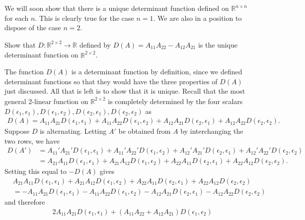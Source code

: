 \documentclass[12pt,letterpaper,reqno]{article}
\numberwithin{equation}{section}
\begin{document}
We will soon show that there is a unique determinant function defined on $\mathbb{R}^{\overline{n} \times \overline{n}}$ for each $n$. This is clearly true for the case $n=1$. We are also in a position to dispose of the case $n=2$.

\begin{exercise}
Show that $D:\mathbb{R}^{\overline{2} \times \overline{2}} \to \mathbb{R}$ defined by $D(A)=A_{11}A_{22}-A_{12}A_{21}$ is the unique determinant function on $\mathbb{R}^{\overline{2} \times \overline{2}}$.
\end{exercise}

{\color{red} 
The function $D(A)$ is a determinant function by definition, since we defined determinant functions so that they would have the three properties of $D(A)$ just discussed. All that is left is to show that it is unique. Recall that the most general 2-linear function on $\mathbb{R}^{\overline{2} \times \overline{2}}$ is completely determined by the four scalars $D(\epsilon_1,\epsilon_1), D(\epsilon_1,\epsilon_2), D(\epsilon_2,\epsilon_1), D(\epsilon_2,\epsilon_2)$ as
\begin{align*}
	D(A)=A_{11}A_{21}D(\epsilon_1,\epsilon_1)+A_{11}A_{22}D(\epsilon_1,\epsilon_2)+A_{12}A_{21}D(\epsilon_2,\epsilon_1)+A_{12}A_{22}D(\epsilon_2,\epsilon_2).
\end{align*}
Suppose $D$ is alternating. Letting $A'$ be obtained from $A$ by interchanging the two rows, we have
\begin{align*}
D(A')&=A_{11}'A_{21}'D(\epsilon_1,\epsilon_1)+A_{11}'A_{22}'D(\epsilon_1,\epsilon_2)+A_{12}'A_{21}'D(\epsilon_2,\epsilon_1)+A_{12}'A_{22}'D(\epsilon_2,\epsilon_2) \\
	&=A_{21}A_{11}D(\epsilon_1,\epsilon_1)+A_{21}A_{12}D(\epsilon_1,\epsilon_2)+A_{22}A_{11}D(\epsilon_2,\epsilon_1)+A_{22}A_{12}D(\epsilon_2,\epsilon_2).
\end{align*}
Setting this equal to $-D(A)$ gives
\begin{align*}
	&A_{21}A_{11}D(\epsilon_1,\epsilon_1)+A_{21}A_{12}D(\epsilon_1,\epsilon_2)+A_{22}A_{11}D(\epsilon_2,\epsilon_1)+A_{22}A_{12}D(\epsilon_2,\epsilon_2)\\
	&=-A_{11}A_{21}D(\epsilon_1,\epsilon_1)-A_{11}A_{22}D(\epsilon_1,\epsilon_2)-A_{12}A_{21}D(\epsilon_2,\epsilon_1)-A_{12}A_{22}D(\epsilon_2,\epsilon_2)
\end{align*}
and therefore
\begin{align*}
	&2A_{11}A_{21}D(\epsilon_1,\epsilon_1)+(A_{11}A_{22}+A_{12}A_{21})D(\epsilon_1,\epsilon_2)\\

\end{align*}}
\end{document}
